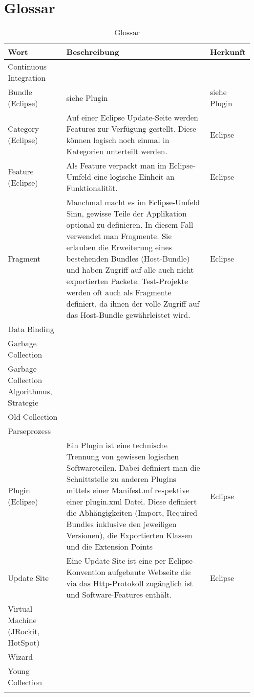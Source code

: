 \chapter*{Glossar}\label{glossar}
  \begin{longtable}{|p{5cm}|p{6cm}|p{3cm}|}
\hline
  \textbf{Wort} & \textbf{Beschreibung} & \textbf{Herkunft}\\\hline
  Continuous Integration  &&\\\hline
  Bundle (Eclipse) & siehe Plugin & siehe Plugin\\\hline
  Category (Eclipse) & Auf einer Eclipse Update-Seite werden Features zur Verfügung gestellt. Diese können logisch noch einmal in Kategorien unterteilt werden. & Eclipse\\\hline
  Feature (Eclipse) & Als Feature verpackt man im Eclipse-Umfeld eine logische Einheit an Funktionalität. & Eclipse\\\hline
  Fragment & Manchmal macht es im Eclipse-Umfeld Sinn, gewisse Teile der Applikation optional zu definieren. In diesem Fall verwendet man Fragmente. Sie erlauben die Erweiterung eines bestehenden Bundles (Host-Bundle) und haben Zugriff auf alle auch nicht exportierten Packete. Test-Projekte werden oft auch als Fragmente definiert, da ihnen der volle Zugriff auf das Host-Bundle gewährleistet wird. & Eclipse\\\hline
  Data Binding & & \\\hline
  Garbage Collection & & \\\hline
  Garbage Collection Algorithmus, Strategie & & \\\hline
  Old Collection & & \\\hline
  Parseprozess & & \\\hline
  Plugin (Eclipse) & Ein Plugin ist eine technische Trennung von gewissen logischen Softwareteilen. Dabei definiert man die Schnittstelle zu anderen Plugins mittels einer Manifest.mf respektive einer plugin.xml Datei. Diese definiert die Abhängigkeiten (Import, Required Bundles inklusive den jeweiligen Versionen), die Exportierten Klassen und die Extension Points  & Eclipse\\\hline
  Update Site & Eine Update Site ist eine per Eclipse-Konvention aufgebaute Webseite die via das Http-Protokoll zugänglich ist und Software-Features enthält.& Eclipse\\\hline
  Virtual Machine (JRockit, HotSpot) & & \\\hline
  Wizard && \\\hline
  Young Collection & & \\\hline

      \caption{Glossar}\\
  \end{longtable}


